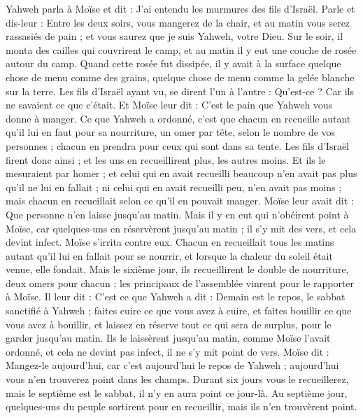 \begin{multicols}{2}
Yahweh parla à Moïse et dit :
J'ai entendu les murmures des fils d'Israël. Parle et dis-leur : Entre les deux soirs, vous mangerez de la chair, et au matin vous serez rassasiés de pain ; et vous saurez que je suis Yahweh, votre Dieu.
Sur le soir, il monta des cailles qui couvrirent le camp, et au matin il y eut une couche de rosée autour du camp.
Quand cette rosée fut dissipée, il y avait à la surface quelque chose de menu comme des grains, quelque chose de menu comme la gelée blanche sur la terre.
Les fils d'Israël ayant vu, se dirent l'un à l'autre : Qu'est-ce ? Car ils ne savaient ce que c'était. Et Moïse leur dit : C'est le pain que Yahweh vous donne à manger.
Ce que Yahweh a ordonné, c'est que chacun en recueille autant qu'il lui en faut pour sa nourriture, un omer par tête, selon le nombre de vos personnes ; chacun en prendra pour ceux qui sont dans sa tente.
Les fils d'Israël firent donc ainsi ; et les uns en recueillirent plus, les autres moins.
Et ils le mesuraient par homer ; et celui qui en avait recueilli beaucoup n'en avait pas plus qu'il ne lui en fallait ; ni celui qui en avait recueilli peu, n'en avait pas moins ; mais chacun en recueillait selon ce qu'il en pouvait manger.
Moïse leur avait dit : Que personne n'en laisse jusqu’au matin.
Mais il y en eut qui n'obéirent point à Moïse, car quelques-uns en réservèrent jusqu'au matin ; il s'y mit des vers, et cela devint infect. Moïse s’irrita contre eux.
Chacun en recueillait tous les matins autant qu'il lui en fallait pour se nourrir, et lorsque la chaleur du soleil était venue, elle fondait.
Mais le sixième jour, ils recueillirent le double de nourriture, deux omers pour chacun ; les principaux de l'assemblée vinrent pour le rapporter à Moïse.
Il leur dit : C'est ce que Yahweh a dit : Demain est le repos, le sabbat sanctifié à Yahweh ; faites cuire ce que vous avez à cuire, et faites bouillir ce que vous avez à bouillir, et laissez en réserve tout ce qui sera de surplus, pour le garder jusqu'au matin.
Ils le laissèrent jusqu’au matin, comme Moïse l'avait ordonné, et cela ne devint pas infect, il ne s’y mit point de vers.
Moïse dit : Mangez-le aujourd'hui, car c'est aujourd'hui le repos de Yahweh ; aujourd'hui vous n'en trouverez point dans les champs.
Durant six jours vous le recueillerez, mais le septième est le sabbat, il n'y en aura point ce jour-là.
Au septième jour, quelques-uns du peuple sortirent pour en recueillir, mais ils n'en trouvèrent point.

\end{multicols}
